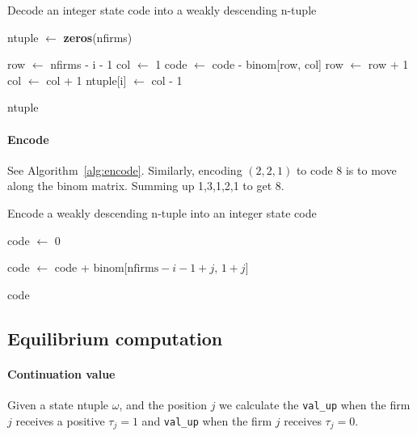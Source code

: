 \documentclass[12pt]{article}[margin=1in]
\begin{document}
\begin{algorithm}[!htbp]
    \caption{Decode an integer state code into a weakly descending n-tuple}
    \begin{algorithmic}[1]
        \State ntuple $\gets$ \textbf{zeros}(nfirms) 

        \State row $\gets$ nfirms - i - 1
        \State col $\gets$ 1
        \State code $\gets$ code - binom[row, col]
        \State row $\gets$ row + 1
        \State col $\gets$ col + 1
        \EndWhile
        \State ntuple[i] $\gets$ col - 1
        \EndFor

        \State \Return ntuple
        \EndFunction
    \end{algorithmic}
    \label{alg:decode}
\end{algorithm}

\paragraph{Encode} See Algorithm~\ref{alg:encode}. Similarly, encoding $(2,2,1)$ to code 8 is to move along the binom matrix. Summing up 1,3,1,2,1 to get 8.

\begin{algorithm}
    \caption{Encode a weakly descending n-tuple into an integer state code}
    \begin{algorithmic}[1]
        \State code $\gets$ 0 

        \State code $\gets$ code + binom[$\text{nfirms} - i - 1 + j$, $1 + j$]
        \EndFor
        \EndFor

        \State \Return code
        \EndFunction
    \end{algorithmic}
    \label{alg:encode}
\end{algorithm}

\subsection{Equilibrium computation}
\paragraph{Continuation value} Given a state ntuple $\omega$, and the position $j$ we calculate the \verb|val_up| when the firm $j$ receives a positive $\tau_j=1$ and \verb|val_up| when the firm $j$ receives $\tau_j=0$.
\end{document}
